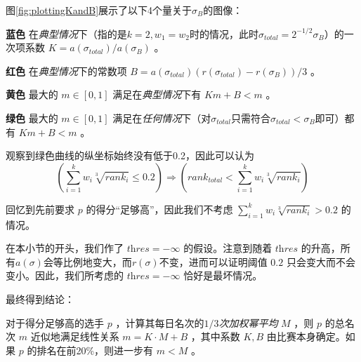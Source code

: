             图\ref{fig:plottingKandB}展示了以下4个量关于$\sigma_B$的图像：
            \begin{asparaitem}
                \vspace{1ex}
                \item [\textbf{蓝色}] 在\emph{典型情况}下（指的是$k=2,w_1=w_2$时的情况，此时$\sigma_{\textit{total}}=2^{-1/2}\sigma_B$）的一次项系数 $K=a(\sigma_{\textit{total}})/a(\sigma_B)$ 。
                \vspace{1ex}
                \item [\textbf{红色}] 在\emph{典型情况}下的常数项 $B=a(\sigma_{\textit{total}})\left(r(\sigma_{\textit{total}})-r(\sigma_B)\right)/3$ 。
                \vspace{1ex}
                \item [\textbf{黄色}] 最大的 $m\in [0,1]$ 满足在\emph{典型情况}下有 $Km+B<m$ 。
                \vspace{1ex}
                \item [\textbf{绿色}] 最大的 $m\in [0,1]$ 满足在\emph{任何情况}下（对$\sigma_{\textit{total}}$只需符合$\sigma_{\textit{total}}<\sigma_B$即可）都有 $Km+B<m$ 。
                \vspace{1ex}
            \end{asparaitem}

            观察到绿色曲线的纵坐标始终没有低于0.2，因此可以认为
            $$
            \left(\sum\limits_{i=1}^k w_i\sqrt[3]{\textit{rank}_i}\leq 0.2\right)\Rightarrow
            \left(\textit{rank}_{\textit{total}}<\sum\limits_{i=1}^k w_i\sqrt[3]{\textit{rank}_i}\right)
            $$

            回忆到先前要求 $p$ 的得分“足够高”，因此我们不考虑 $\sum_{i=1}^k w_i\sqrt[3]{\textit{rank}_i}>0.2$ 的情况。

            在本小节的开头，我们作了 $\textit{thres}=-\infty$ 的假设。注意到随着 $\textit{thres}$ 的升高，所有$a(\sigma)$会等比例地变大，而$r(\sigma)$不变，进而可以证明阈值 $0.2$ 只会变大而不会变小。因此，我们所考虑的 $\textit{thres}=-\infty$ 恰好是最坏情况。

            \vspace{1.5ex}

            最终得到结论：

            \begin{tcolorbox}[colback=white,colframe=black,boxrule=0.5pt,arc=0pt]
                对于得分足够高的选手 $p$ ，计算其每日名次的\emph{$1/3$次加权幂平均} $M$ ，则 $p$ 的总名次 $m$ 近似地满足线性关系 $m=K\cdot M+B$ ，其中系数 $K,B$ 由比赛本身确定。如果 $p$ 的排名在前20\%，则进一步有 $m<M$ 。
            \end{tcolorbox}


